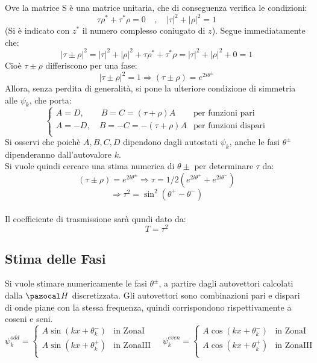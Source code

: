 %
Ove la matrice S è una matrice unitaria, che di conseguenza verifica le condizioni:
$$ \tau\rho^* + \tau^*\rho = 0 \quad,\quad |\tau|^2 + |\rho|^2 = 1$$
(Si è indicato con $z^*$ il numero complesso coniugato di $z$). Segue immediatamente che:
$$ |\tau \pm \rho|^2 = |\tau|^2 + |\rho|^2 + \tau\rho^* + \tau^*\rho = |\tau|^2 + |\rho|^2 + 0 = 1$$
Cioè $\tau \pm \rho$ differiscono per una fase:
$$ |\tau \pm \rho|^2 = 1 \Rightarrow (\tau \pm \rho) = e^{2i\theta^\pm}$$
%
Allora, senza perdita di generalità, si pone la ulteriore condizione di simmetria alle $\psi_k$, che porta:
$$\begin{cases}
    A = D, \qquad  B = C = (\tau + \rho)A &\mbox{per funzioni pari} \\
    A = -D, \quad B = -C = -(\tau + \rho)A &\mbox{per funzioni dispari}\\
\end{cases}$$
%
Si osservi che poichè $A,B,C,D$ dipendono dagli autostati $\psi_k$, anche le fasi $\theta^\pm$ dipenderanno dall'autovalore $k$.\\
Si vuole quindi cercare una stima numerica di $\theta\pm$ per determinare $\tau$ da:
    $$ (\tau \pm \rho) = e^{2i\theta^\pm} \Rightarrow \tau = 1/2(e^{2i\theta^+}+e^{2i\theta^-})$$
    $$ \Rightarrow \tau^2 = \sin^2(\theta^+ - \theta^-)$$
\\
Il coefficiente di trasmissione sarà qundi dato da:
    $$T = \tau^2$$

\subsection*{Stima delle Fasi}
Si vuole stimare numericamente le fasi $\theta^\pm$, a partire dagli autovettori
calcolati dalla $\Hh$ discretizzata. Gli autovettori sono combinazioni pari e dispari
di onde piane con la stessa frequenza, quindi corrispondono rispettivamente a coseni e seni.
    $$ \psi_k^{odd} = \begin{cases}
        A\sin(kx + \theta^-_k) & \mbox{in ZonaI} \\
        A\sin(kx + \theta^+_k) & \mbox{in ZonaIII} \\
    \end{cases}
    \quad
    \psi_k^{even} = \begin{cases}
        A\cos(kx + \theta^-_k) & \mbox{in ZonaI} \\
        A\cos(kx + \theta^+_k) & \mbox{in ZonaIII} \\
    \end{cases}
    $$
 \smallskip

